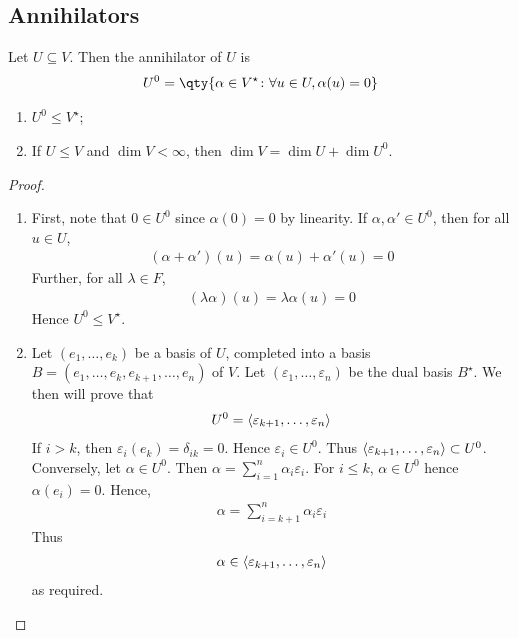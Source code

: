 \subsection{Annihilators}
\begin{definition}
	Let $U \subseteq V$.
	Then the annihilator of $U$ is
	\begin{align*}
		U^0 = \qty{\alpha \in V^\star \colon \forall u \in U, \alpha(u) = 0}
	\end{align*}
\end{definition}
\begin{lemma}
	\begin{enumerate}
		\item $U^0 \leq V^\star$;
		\item If $U \leq V$ and $\dim V < \infty$, then $\dim V = \dim U + \dim U^0$.
	\end{enumerate}
\end{lemma}
\begin{proof}
	\begin{enumerate}
		\item First, note that $0 \in U^0$ since $\alpha(0) = 0$ by linearity.
		      If $\alpha, \alpha' \in U^0$, then for all $u \in U$,
		      \begin{align*}
			      (\alpha + \alpha')(u) = \alpha(u) + \alpha'(u) = 0
		      \end{align*}
		      Further, for all $\lambda \in F$,
		      \begin{align*}
			      (\lambda \alpha)(u) = \lambda \alpha(u) = 0
		      \end{align*}
		      Hence $U^0 \leq V^\star$.
		\item Let $(e_1, \dots, e_k)$ be a basis of $U$, completed into a basis $B = (e_1, \dots, e_k, e_{k+1}, \dots, e_n)$ of $V$.
		      Let $(\varepsilon_1, \dots, \varepsilon_n)$ be the dual basis $B^\star$.
		      We then will prove that
		      \begin{align*}
			      U^0 = \langle{} \varepsilon_{k+1}, \dots, \varepsilon_n \rangle
		      \end{align*}
		      If $i > k$, then $\varepsilon_i(e_k) = \delta_{ik} = 0$.
		      Hence $\varepsilon_i \in U^0$.
		      Thus $\langle{} \varepsilon_{k+1}, \dots, \varepsilon_n \rangle \subset U^0$.
		      Conversely, let $\alpha \in U^0$.
		      Then $\alpha = \sum_{i=1}^n \alpha_i \varepsilon_i$.
		      For $i \leq k$, $\alpha \in U^0$ hence $\alpha(e_i) = 0$.
		      Hence,
		      \begin{align*}
			      \alpha = \sum_{i=k+1}^n \alpha_i \varepsilon_i
		      \end{align*}
		      Thus
		      \begin{align*}
			      \alpha \in \langle{} \varepsilon_{k+1}, \dots, \varepsilon_n \rangle
		      \end{align*}
		      as required.
	\end{enumerate}
\end{proof}

